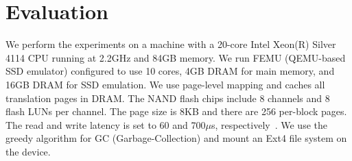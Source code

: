 \section{Evaluation}
We perform the experiments on a machine with a 20-core Intel Xeon(R) Silver
4114 CPU running at 2.2GHz and 84GB memory. We run FEMU (QEMU-based SSD
emulator) configured to use 10 cores, 4GB DRAM for main memory, and 16GB DRAM
for SSD emulation. We use page-level mapping and caches all translation pages in DRAM. 
The NAND flash chips include 8 channels and 8 flash
LUNs per channel. The page size is 8KB and there are 256 per-block pages. The
read and write latency is set to 60 and 700$\mu$s,
respectively~\cite{cheong2018flash}. We use the greedy algorithm for
GC (Garbage-Collection) and mount an Ext4 file system on the device.

